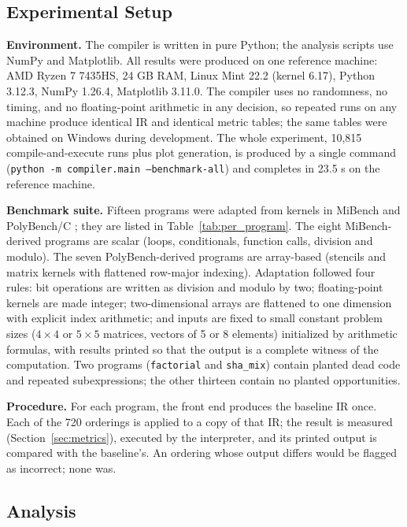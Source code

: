 \documentclass[conference]{IEEEtran}
\begin{document}
\subsection{Experimental Setup}
\label{sec:setup}

\textbf{Environment.} The compiler is written in pure Python; the analysis scripts use NumPy and Matplotlib. All results were produced on one reference machine: AMD Ryzen 7 7435HS, 24 GB RAM, Linux Mint 22.2 (kernel 6.17), Python 3.12.3, NumPy 1.26.4, Matplotlib 3.11.0. The compiler uses no randomness, no timing, and no floating-point arithmetic in any decision, so repeated runs on any machine produce identical IR and identical metric tables; the same tables were obtained on Windows during development. The whole experiment, 10,815 compile-and-execute runs plus plot generation, is produced by a single command (\texttt{python -m compiler.main --benchmark-all}) and completes in 23.5 s on the reference machine.

\textbf{Benchmark suite.} Fifteen programs were adapted from kernels in MiBench \cite{ref32} and PolyBench/C \cite{ref31}; they are listed in Table~\ref{tab:per_program}. The eight MiBench-derived programs are scalar (loops, conditionals, function calls, division and modulo). The seven PolyBench-derived programs are array-based (stencils and matrix kernels with flattened row-major indexing). Adaptation followed four rules: bit operations are written as division and modulo by two; floating-point kernels are made integer; two-dimensional arrays are flattened to one dimension with explicit index arithmetic; and inputs are fixed to small constant problem sizes ($4 \times 4$ or $5 \times 5$ matrices, vectors of 5 or 8 elements) initialized by arithmetic formulas, with results printed so that the output is a complete witness of the computation. Two programs (\texttt{factorial} and \texttt{sha\_mix}) contain planted dead code and repeated subexpressions; the other thirteen contain no planted opportunities.

\textbf{Procedure.} For each program, the front end produces the baseline IR once. Each of the 720 orderings is applied to a copy of that IR; the result is measured (Section~\ref{sec:metrics}), executed by the interpreter, and its printed output is compared with the baseline's. An ordering whose output differs would be flagged as incorrect; none was.

\subsection{Analysis}
\label{sec:analysis}
\end{document}
